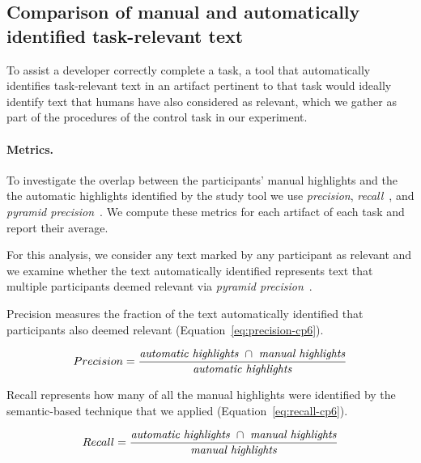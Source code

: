 
\subsection{Comparison of manual and automatically identified task-relevant text}
\label{cp6:comparison}


To assist a developer correctly complete a task, a tool that
automatically identifies task-relevant text in an artifact pertinent to that task would ideally 
identify text that humans have also considered as relevant, which we gather as part of the procedures 
of the control task in our experiment. 



\paragraph{\textbf{Metrics.}}

To investigate the overlap between the participants' manual highlights and the 
the automatic highlights identified by the study tool we use \textit{precision}, \textit{recall}~\cite{manning2010IR}, and \textit{pyramid precision}~\cite{Nenkova2004}.
We compute these metrics for each artifact of each task and report their average.


For this analysis, we consider any text marked by any participant as relevant
and we examine whether 
the text automatically identified represents text that multiple participants deemed relevant
 via \textit{pyramid precision}~\cite{Lotufo2012}.


Precision measures the fraction of the text automatically identified  that participants also deemed relevant (Equation~\ref{eq:precision-cp6}). 

\smallskip
\begin{small}
\begin{equation}
    Precision = \frac{
        \text{\textit{automatic highlights}~} \cap 
        \text{~\textit{manual highlights}}
    }{\text{\textit{automatic highlights}}}
\label{eq:precision-cp6}    
\end{equation}
\end{small}


Recall represents how many of all the manual highlights were identified by the semantic-based technique that we applied (Equation~\ref{eq:recall-cp6}). 



\smallskip
\begin{small}
\begin{equation}
    Recall = \frac{
        \text{\textit{automatic highlights}~} \cap 
        \text{~\textit{manual highlights}}
    }{\text{\textit{manual highlights}}}
\label{eq:recall-cp6}    
\end{equation}
\end{small}

